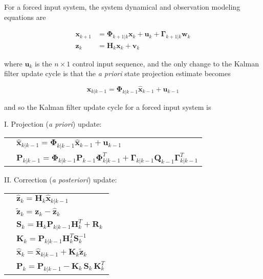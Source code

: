 For a forced input system, the system dynamical and observation modeling equations are

\begin{equation*}
    \begin{aligned}
        \mathbf{x}_{k+1} &= \mathbf{\Phi}_{k+1|k} \mathbf{x}_k + \mathbf{u}_k + \mathbf{\Gamma}_{k+1|k} \mathbf{w}_k \\
        \mathbf{z}_k &= \mathbf{H}_k \mathbf{x}_k + \mathbf{v}_k
    \end{aligned}
\end{equation*}

where $\mathbf{u}_k$ is the $n \times 1$ control input sequence, and the only change to
the Kalman filter update cycle is that the \textit{a priori} state projection estimate becomes

\begin{equation*}
    \hat{\mathbf{x}}_{k|k-1} = \mathbf{\Phi}_{k|k-1} \hat{\mathbf{x}}_{k-1} + \mathbf{u}_{k-1}
\end{equation*}

and so the Kalman filter update cycle for a forced input system is

I. Projection (\textit{a priori}) update:

\begingroup
\renewcommand{\arraystretch}{1.25}
\begin{tabular}{l l}
\phantom{.} & $\hat{\mathbf{x}}_{k|k-1} = \mathbf{\Phi}_{k|k-1} \hat{\mathbf{x}}_{k-1} + \mathbf{u}_{k-1}$ \\
\phantom{.} & $\mathbf{P}_{k|k-1} = \mathbf{\Phi}_{k|k-1} \mathbf{P}_{k-1} \mathbf{\Phi}_{k|k-1}^T + \mathbf{\Gamma}_{k|k-1} \mathbf{Q}_{k-1} \mathbf{\Gamma}_{k|k-1}^T$
\end{tabular}
\endgroup

II. Correction (\textit{a posteriori}) update:

\begingroup
\renewcommand{\arraystretch}{1.25}
\begin{tabular}{l l}
\phantom{.} & $\hat{\mathbf{z}}_k = \mathbf{H}_k \hat{\mathbf{x}}_{k|k-1}$ \\
\phantom{.} & $\tilde{\mathbf{z}}_k = \mathbf{z}_k - \hat{\mathbf{z}}_k$ \\
\phantom{.} & $\mathbf{S}_k = \mathbf{H}_k \mathbf{P}_{k|k-1} \mathbf{H}_k^T + \mathbf{R}_k$ \\
\phantom{.} & $\mathbf{K}_k = \mathbf{P}_{k|k-1} \mathbf{H}_{k}^T \mathbf{S}_k^{-1}$ \\
\phantom{.} & $\hat{\mathbf{x}}_k = \hat{\mathbf{x}}_{k|k-1} +\mathbf{K}_k \tilde{\mathbf{z}}_k$ \\
\phantom{.} & $\mathbf{P}_k = \mathbf{P}_{k|k-1} - \mathbf{K}_{k} \, \mathbf{S}_{k} \, \mathbf{K}_{k}^T$
\end{tabular}
\endgroup

